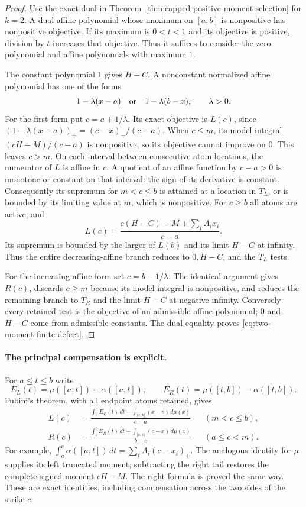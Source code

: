 \documentclass[11pt]{article}
\theoremstyle{definition}
\begin{document}
\begin{proof}
Use the exact dual in
Theorem~\ref{thm:capped-positive-moment-selection} for $k=2$.
A dual affine polynomial whose maximum on $[a,b]$ is
nonpositive has nonpositive objective. If its maximum is
$0<t<1$ and its objective is positive, division by $t$
increases that objective. Thus it suffices to consider the
zero polynomial and affine polynomials with maximum $1$.

The constant polynomial $1$ gives $H-C$.
A nonconstant normalized affine polynomial has one of the forms
\[
 1-\lambda(x-a)\quad\hbox{or}\quad1-\lambda(b-x),
                       \qquad\lambda>0.
\]
For the first form put $c=a+1/\lambda$.
Its exact objective is $L(c)$, since
$(1-\lambda(x-a))_+=(c-x)_+/(c-a)$.
When $c\le m$, its model integral $(cH-M)/(c-a)$ is
nonpositive, so its objective cannot improve on $0$.
This leaves $c>m$.
On each interval between consecutive atom locations, the
numerator of $L$ is affine in $c$. A quotient of an affine
function by $c-a>0$ is monotone or constant on that interval:
the sign of its derivative is constant.
Consequently its supremum for $m<c\le b$ is attained at a
location in $T_L$, or is bounded by its limiting value at $m$,
which is nonpositive.
For $c\ge b$ all atoms are active, and
\[
 L(c)=\frac{c(H-C)-M+\sum_i A_i x_i}{c-a}.
\]
Its supremum is bounded by the larger of $L(b)$ and its
limit $H-C$ at infinity. Thus the entire decreasing-affine
branch reduces to $0,H-C$, and the $T_L$ tests.

For the increasing-affine form set $c=b-1/\lambda$.
The identical argument gives $R(c)$, discards $c\ge m$
because its model integral is nonpositive, and reduces the
remaining branch to $T_R$ and the limit $H-C$ at negative
infinity. Conversely every retained test is the objective
of an admissible affine polynomial; $0$ and $H-C$ come
from admissible constants. The dual equality proves
\eqref{eq:two-moment-finite-defect}.
\end{proof}

\paragraph{The principal compensation is explicit.}
For $a\le t\le b$ write
\[
 E_L(t)=\mu([a,t])-\alpha([a,t]),\qquad
 E_R(t)=\mu([t,b])-\alpha([t,b]).
\]
Fubini's theorem, with all endpoint atoms retained, gives
\begin{align}
 L(c)&=
 \frac{\displaystyle\int_a^c E_L(t)\,dt
            -\displaystyle\int_{(c,b]}(x-c)\,d\mu(x)}{c-a}
                                  &&(m<c\le b),
 \label{eq:two-moment-left-compensation}\\
 R(c)&=
 \frac{\displaystyle\int_c^b E_R(t)\,dt
            -\displaystyle\int_{[a,c)}(c-x)\,d\mu(x)}{b-c}
                                  &&(a\le c<m).
 \label{eq:two-moment-right-compensation}
\end{align}
For example,
$\int_a^c\alpha([a,t])\,dt=\sum_i A_i(c-x_i)_+$.
The analogous identity for $\mu$ supplies its left truncated
moment; subtracting the right tail restores the complete
signed moment $cH-M$. The right formula is proved the same way.
These are exact identities, including compensation across the
two sides of the strike $c$.
\end{document}
